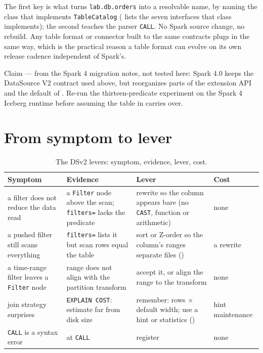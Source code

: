 The first key is what turns \texttt{lab.db.orders} into a resolvable name, by naming
the class that implements \texttt{TableCatalog} ( lists
the seven interfaces that class implements); the second teaches the parser
\texttt{CALL}. No Spark source change, no rebuild. Any table format or connector
built to the same contracts plugs in the same way, which is the practical reason a
table format can evolve on its own release cadence independent of Spark's.

\begin{note}
Claim --- from the Spark 4 migration notes, not tested here: Spark 4.0 keeps the
DataSource V2 contract used above, but reorganizes parts of the extension API and
the default of . Re-run the thirteen-predicate
experiment on the Spark 4 Iceberg runtime before assuming the table in
 carries over.
\end{note}

\section{From symptom to lever}
\label{sec:dsv2-levers}

\begin{table}[htbp]
\centering\footnotesize
\renewcommand{\arraystretch}{1.25}
\begin{tabular}{@{}P{3.1cm}P{3.7cm}P{4.1cm}P{3.2cm}@{}}
\toprule
\textbf{Symptom} & \textbf{Evidence} & \textbf{Lever} & \textbf{Cost} \\
\midrule
a filter does not reduce the data read & a \texttt{Filter} node above the scan; \texttt{filters=} lacks the predicate & rewrite so the column appears bare (no \texttt{CAST}, function or arithmetic) & none \\
a pushed filter still scans everything & \texttt{filters=} lists it but scan rows equal the table & sort or Z-order so the column's ranges separate files () & a rewrite \\
a time-range filter leaves a \texttt{Filter} node & range does not align with the partition transform & accept it, or align the range to the transform & none \\
join strategy surprises & \texttt{EXPLAIN COST}: estimate far from disk size & remember: rows $\times$ default width; use a hint or statistics () & hint maintenance \\
\texttt{CALL} is a syntax error &  at \texttt{CALL} & register  & none \\
\bottomrule
\end{tabular}
\caption{The DSv2 levers: symptom, evidence, lever, cost.}
\label{tab:dsv2-levers}
\end{table}

